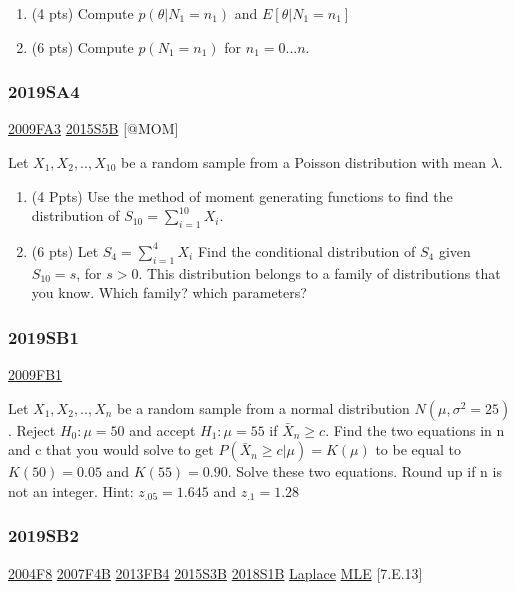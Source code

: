 \documentclass[6pt,Portrait]{article}
\begin{document}
\begin{enumerate}
\def\labelenumi{(\alph{enumi})}
\item
  (4 pts) Compute \(p(\theta|N_1=n_1)\) and \(E[\theta|N_1=n_1]\)
\item
  (6 pts) Compute \(p(N_1=n_1)\) for \(n_1=0...n\).
\end{enumerate}

\hypertarget{sa4-3}{%
\subsubsection{2019SA4}\label{sa4-3}}

\protect\hyperlink{fa3}{2009FA3} \protect\hyperlink{s5b-1}{2015S5B}
{[}@MOM{]}

Let \(X_1,X_2,..,X_{10}\) be a random sample from a Poisson distribution
with mean \(\lambda\).

\begin{enumerate}
\def\labelenumi{(\alph{enumi})}
\item
  (4 Ppts) Use the method of moment generating functions to find the
  distribution of \(S_{10}=\sum^{10}_{i=1} X_i\).
\item
  (6 pts) Let \(S_4=\sum_{i=1}^4X_i\) Find the conditional distribution
  of \(S_4\) given \(S_{10}=s\), for \(s>0\). This distribution belongs
  to a family of distributions that you know. Which family? which
  parameters?
\end{enumerate}

\hypertarget{sb1-3}{%
\subsubsection{2019SB1}\label{sb1-3}}

\protect\hyperlink{fb1}{2009FB1}

Let \(X_1,X_2,..,X_n\) be a random sample from a normal distribution
\(N(\mu,\sigma^2=25)\). Reject \(H_0:\mu=50\) and accept \(H_1:\mu=55\)
if \(\bar X_n\ge c\). Find the two equations in n and c that you would
solve to get \(P(\bar X_n\ge c|\mu)=K(\mu)\) to be equal to
\(K(50)=0.05\) and \(K(55)=0.90\). Solve these two equations. Round up
if n is not an integer. Hint: \(z_{.05}=1.645\) and \(z_{.1}=1.28\)

\hypertarget{sb2-3}{%
\subsubsection{2019SB2}\label{sb2-3}}

\protect\hyperlink{f8-2}{2004F8} \protect\hyperlink{f4b}{2007F4B}
\protect\hyperlink{fb4-2}{2013FB4} \protect\hyperlink{s3b-1}{2015S3B}
\protect\hyperlink{s1b-2}{2018S1B} \protect\hyperlink{Laplace}{Laplace}
\protect\hyperlink{MLE}{MLE} {[}7.E.13{]}\protect\hyperlink{section}{}
\end{document}
